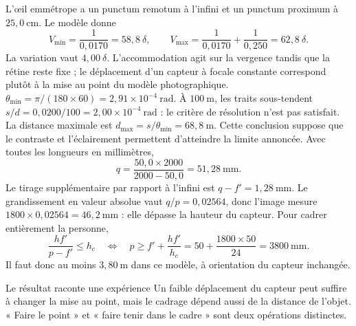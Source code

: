 L'œil emmétrope a un punctum remotum à l'infini et un punctum proximum à $25{,}0\ \mathrm{cm}$. Le modèle donne
\[V_{\min}=\frac1{0{,}0170}=58{,}8\ \delta,\qquad
V_{\max}=\frac1{0{,}0170}+\frac1{0{,}250}=62{,}8\ \delta.\]
La variation vaut $4{,}00\ \delta$. L'accommodation agit sur la vergence tandis que la rétine reste fixe ; le déplacement d'un capteur à focale constante correspond plutôt à la mise au point du modèle photographique.
$\theta_{\min}=\pi/(180\times60)=2{,}91\times10^{-4}\ \mathrm{rad}$. À $100\ \mathrm{m}$, les traits sous-tendent $s/d=0{,}0200/100=2{,}00\times10^{-4}\ \mathrm{rad}$ : le critère de résolution n'est pas satisfait.
La distance maximale est $d_{\max}=s/\theta_{\min}=68{,}8\ \mathrm{m}$. Cette conclusion suppose que le contraste et l'éclairement permettent d'atteindre la limite annoncée.
Avec toutes les longueurs en millimètres,
\[q=\frac{50{,}0\times2000}{2000-50{,}0}=51{,}28\ \mathrm{mm}.\]
Le tirage supplémentaire par rapport à l'infini est $q-f'=1{,}28\ \mathrm{mm}$. Le grandissement en valeur absolue vaut $q/p=0{,}02564$, donc l'image mesure $1800\times0{,}02564=46{,}2\ \mathrm{mm}$ : elle dépasse la hauteur du capteur.
Pour cadrer entièrement la personne,
\[\frac{hf'}{p-f'}\leq h_c\quad\Longleftrightarrow\quad
p\geq f'+\frac{hf'}{h_c}
=50+\frac{1800\times50}{24}=3800\ \mathrm{mm}.\]
Il faut donc au moins $3{,}80\ \mathrm{m}$ dans ce modèle, à orientation du capteur inchangée.
\begin{methode}{Le résultat raconte une expérience}
Un faible déplacement du capteur peut suffire à changer la mise au point, mais le cadrage dépend aussi de la distance de l'objet. « Faire le point » et « faire tenir dans le cadre » sont deux opérations distinctes.
\end{methode}

